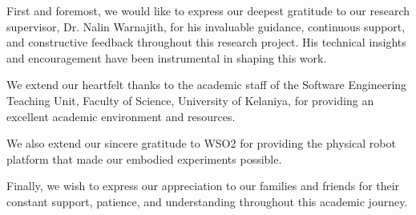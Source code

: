 
\begin{acknowledgement}

First and foremost, we would like to express our deepest gratitude to our research supervisor, Dr. Nalin Warnajith, for his invaluable guidance, continuous support, and constructive feedback throughout this research project. His technical insights and encouragement have been instrumental in shaping this work.

We extend our heartfelt thanks to the academic staff of the Software Engineering Teaching Unit, Faculty of Science, University of Kelaniya, for providing an excellent academic environment and resources.

We also extend our sincere gratitude to WSO2 for providing the physical robot platform that made our embodied experiments possible.

Finally, we wish to express our appreciation to our families and friends for their constant support, patience, and understanding throughout this academic journey.

\end{acknowledgement}
